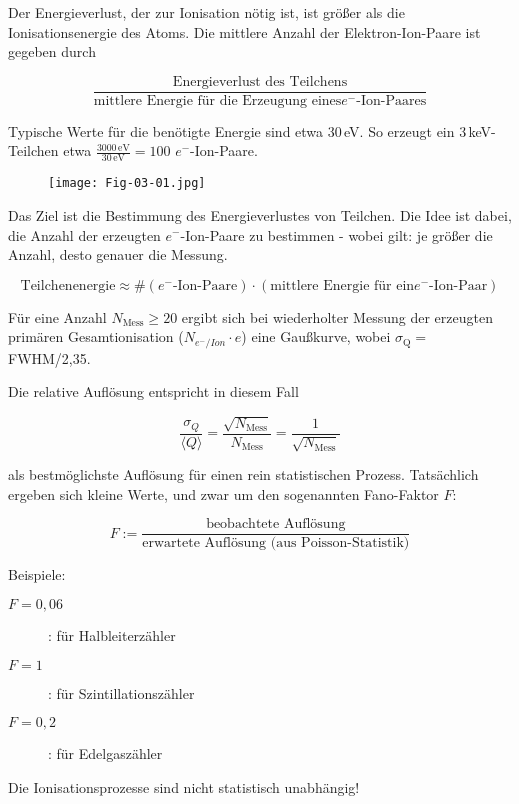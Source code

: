 Der Energieverlust, der zur Ionisation nötig ist, ist größer als die Ionisationsenergie des Atoms.
Die mittlere Anzahl der Elektron-Ion-Paare ist gegeben durch

\[\frac{\text{Energieverlust des Teilchens}}{\text{mittlere Energie für die Erzeugung eines
$e^-$-Ion-Paares}} \]

Typische Werte für die benötigte Energie sind etwa $30\,$eV. So erzeugt ein $3\,$keV-Teilchen etwa
$\frac{3000\,\text{eV}}{30\,\text{eV}}=100$ $e^-$-Ion-Paare.

\begin{figure}[H]
	\centering
	\texttt{[image: Fig-03-01.jpg]}
\end{figure}

Das Ziel ist die Bestimmung des Energieverlustes von Teilchen. Die Idee ist dabei, die Anzahl der
erzeugten $e^-$-Ion-Paare zu bestimmen - wobei gilt: je größer die Anzahl, desto genauer die
Messung.

\[\text{Teilchenenergie}\approx \#(\text{$e^-$-Ion-Paare})\cdot (\text{mittlere Energie für ein
$e^-$-Ion-Paar})\]

Für eine Anzahl $N_{\text{Mess}}\ge 20$ ergibt sich bei wiederholter Messung der erzeugten primären
Gesamtionisation ($N_{e^-/Ion}\cdot e$) eine Gaußkurve, wobei $\sigma_{\text{Q}}=$FWHM/2,35.

\begin{figure}[H]
		\centering
		
\end{figure}

Die relative Auflösung entspricht in diesem Fall

\[\frac{\sigma_{Q}}{\langle Q \rangle} =
\frac{\sqrt{N_{\text{Mess}}}}{N_{\text{Mess}}}=\frac{1}{\sqrt{N_{\text{Mess}}}}
\]

als bestmöglichste Auflösung für einen rein statistischen Prozess. Tatsächlich ergeben sich kleine
Werte, und zwar um den sogenannten Fano-Faktor $F$:

\[ F:=\frac{\text{beobachtete Auflösung}}{\text{erwartete Auflösung (aus Poisson-Statistik)}} \]

Beispiele:

\begin{description}
\item[$F=0{,}06$]: für Halbleiterzähler
\item[$F=1$]: für Szintillationszähler
\item[$F=0{,}2$]: für Edelgaszähler
\end{description}

Die Ionisationsprozesse sind nicht statistisch unabhängig!

